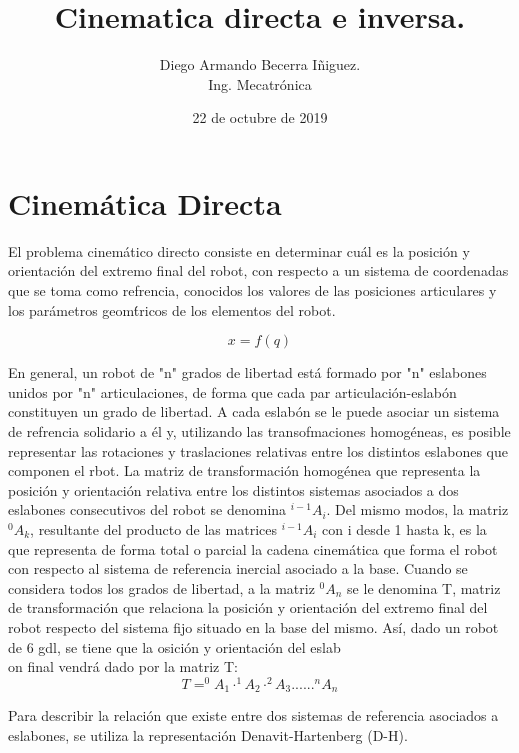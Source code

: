 \documentclass[letter,openright,12pt,spanish]{report}
\title{\textbf{Cinematica directa e inversa.}}
\author{Diego Armando Becerra Iñiguez.\\
		Ing. Mecatr\'onica}
\date{22 de octubre de 2019}
\begin{document}
\maketitle

\section{Cinem\'atica Directa}

El problema cinem\'atico directo consiste en determinar cu\'al es la posici\'on y orientaci\'on del extremo final del robot, con respecto a un sistema de coordenadas que se toma como refrencia, conocidos los valores de las posiciones articulares y los par\'ametros geom\'tricos de los elementos del robot. 

\begin{displaymath}
x=\textit{f}(q)
\end{displaymath}

En general, un robot de "n" grados de libertad est\'a formado por "n" eslabones unidos por "n" articulaciones, de forma que cada par articulaci\'on-eslab\'on constituyen un grado de libertad. A cada eslab\'on se le puede asociar un sistema de refrencia solidario a \'el y, utilizando las transofmaciones homog\'eneas, es posible representar las rotaciones y traslaciones relativas entre los distintos eslabones que componen el rbot. La matriz de transformaci\'on homog\'enea que representa la posici\'on y orientaci\'on relativa entre los distintos sistemas asociados a dos eslabones consecutivos del robot se denomina $^{i-1}A_i$. Del mismo modos, la matriz $^0A_k$, resultante del producto de las matrices $^{i-1}A_i$ con i desde 1 hasta k, es la que representa de forma total o parcial la cadena cinem\'atica que forma el robot con respecto al sistema de referencia inercial asociado a la base. Cuando se considera todos los grados de libertad, a la matriz $^0A_n$ se le denomina T, matriz de transformaci\'on que relaciona la posici\'on y orientaci\'on del extremo final del robot respecto del sistema fijo situado en la base del mismo. As\'i, dado un robot de 6 gdl, se tiene que la osici\'on y orientaci\'on del eslab\\on final vendr\'a dado por la matriz T:\\

\begin{displaymath}
T=^0A_1 \cdot ^1A_2 \cdot ^2A_3... ... ^nA_n
\end{displaymath} 

Para describir la relaci\'on que existe entre dos sistemas de referencia asociados a eslabones, se utiliza la representaci\'on Denavit-Hartenberg (D-H). 
\end{document}
